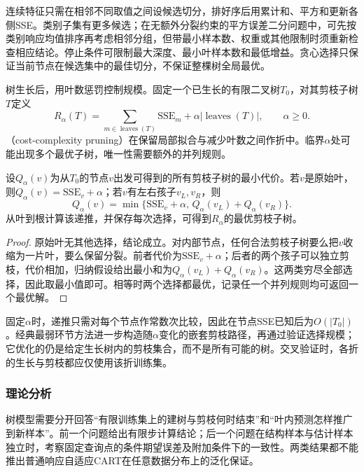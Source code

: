 连续特征只需在相邻不同取值之间设候选切分，排好序后用累计和、平方和更新各侧SSE。类别子集有更多候选；在无额外分裂约束的平方误差二分问题中，可先按类别响应均值排序再考虑相邻分组，但带最小样本数、权重或其他限制时须重新检查相应结论。停止条件可限制最大深度、最小叶样本数和最低增益。贪心选择只保证当前节点在候选集中的最佳切分，不保证整棵树全局最优。

树生长后，用叶数惩罚控制规模。固定一个已生长的有限二叉树$T_0$，对其剪枝子树$T$定义
\begin{equation}
  R_\alpha(T)=\sum_{m\in\operatorname{leaves}(T)}
                    \mathrm{SSE}_m+\alpha|\operatorname{leaves}(T)|,
  \qquad\alpha\geq0.
  \label{eq:regression-pruning}
\end{equation}
（cost-complexity pruning）在保留局部拟合与减少叶数之间作折中。临界$\alpha$处可能出现多个最优子树，唯一性需要额外的并列规则。

\begin{theorem}[固定生长树内的最优剪枝]
  \label{thm:regression-pruning}
  设$Q_\alpha(v)$为从$T_0$的节点$v$出发可得到的所有剪枝子树的最小代价。若$v$是原始叶，则$Q_\alpha(v)=\mathrm{SSE}_v+\alpha$；若$v$有左右孩子$v_L,v_R$，则
  \[
    Q_\alpha(v)=\min\{\mathrm{SSE}_v+\alpha,\,
                     Q_\alpha(v_L)+Q_\alpha(v_R)\}.
  \]
  从叶到根计算该递推，并保存每次选择，可得到$R_\alpha$的最优剪枝子树。
\end{theorem}

\begin{proof}
原始叶无其他选择，结论成立。对内部节点，任何合法剪枝子树要么把$v$收缩为一片叶，要么保留分裂。前者代价为$\mathrm{SSE}_v+\alpha$；后者的两个孩子可以独立剪枝，代价相加，归纳假设给出最小和为$Q_\alpha(v_L)+Q_\alpha(v_R)$。这两类穷尽全部选择，因此取最小值即可。相等时两个选择都最优，记录任一个并列规则均可返回一个最优解。
\end{proof}

固定$\alpha$时，递推只需对每个节点作常数次比较，因此在节点SSE已知后为$O(|T_0|)$。经典最弱环节方法进一步构造随$\alpha$变化的嵌套剪枝路径，再通过验证选择规模；它优化的仍是给定生长树内的剪枝集合，而不是所有可能的树。交叉验证时，各折的生长与剪枝都应仅使用该折训练集。

\subsubsection{理论分析}
\label{sec:regression-cart-theory}

树模型需要分开回答“有限训练集上的建树与剪枝何时结束”和“叶内预测怎样推广到新样本”。前一个问题给出有限步计算结论；后一个问题在结构样本与估计样本独立时，考察固定查询点的条件期望误差及附加条件下的一致性。两类结果都不能推出普通响应自适应CART在任意数据分布上的泛化保证。

